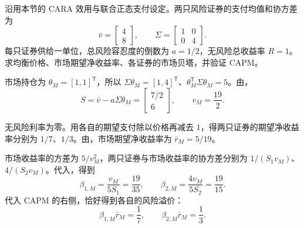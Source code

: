 \begin{tcolorbox}[example,title=补充算例：从均衡价格验证CAPM]
沿用本节的 CARA 效用与联合正态支付设定。两只风险证券的支付均值和协方差为
\[
 \bar v=\begin{bmatrix}4\\8\end{bmatrix},\qquad
 \Sigma=\begin{bmatrix}1&0\\0&4\end{bmatrix}.
\]
每只证券供给一单位，总风险容忍度的倒数为 $a=1/2$，无风险总收益率 $R=1$。求均衡价格、市场期望净收益率、各证券的市场贝塔，并验证 CAPM。
\begin{solution}[blank-type=manual,blank-vsep=5\baselineskip]
市场持仓为 $\theta_M=[1,1]^{\mathsf T}$，所以 $\Sigma\theta_M=[1,4]^{\mathsf T}$、$\theta_M^{\mathsf T}\Sigma\theta_M=5$。由，
\[
 S=\bar v-a\Sigma\theta_M
 =\begin{bmatrix}7/2\\6\end{bmatrix},\qquad
 v_M=\frac{19}{2}.
\]

无风险利率为零。用各自的期望支付除以价格再减去 $1$，得两只证券的期望净收益率分别为 $1/7$、$1/3$。由，市场期望净收益率为 $\bar r_M=5/19$。

市场收益率的方差为 $5/v_M^2$，两只证券与市场收益率的协方差分别为 $1/(S_1v_M)$、$4/(S_2v_M)$。代入，得到
\[
 \beta_{1,M}=\frac{v_M}{5S_1}=\frac{19}{35},\qquad
 \beta_{2,M}=\frac{4v_M}{5S_2}=\frac{19}{15}.
\]
代入 CAPM 的右侧，恰好得到各自的风险溢价：
\[
 \beta_{1,M}\bar r_M=\frac17,\qquad
 \beta_{2,M}\bar r_M=\frac13.
\]
\end{solution}
\end{tcolorbox}

